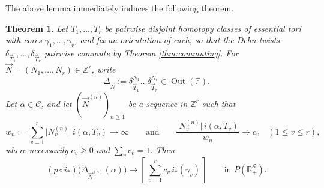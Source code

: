 \documentclass[12pt,a4paper]{amsart}
\numberwithin{equation}{section}
\DeclareMathOperator{\Out}{Out}
\newcommand{\FF}{\mathbb{F}}
\newcommand{\ZZ}{\mathbb{Z}}
\theoremstyle{plain}
\newtheorem{theorem}{Theorem}[section]
\theoremstyle{definition}
\theoremstyle{remark}
\begin{document}

The above lemma immediately induces the following theorem.

\begin{theorem} \label{thm:multi-converge}
    Let $T_1, \dots, T_r$ be pairwise disjoint homotopy classes of essential tori
    with cores $\gamma_1, \dots, \gamma_r$, and fix an orientation of each, so that
    the Dehn twists $\delta_{\vec T_1}, \dots, \delta_{\vec T_r}$ pairwise commute
    by Theorem \ref{thm:commuting}.
    For $\vec N = (N_1, \dots, N_r) \in \ZZ^r$, write
    \[
        \Delta_{\vec N} := \delta_{\vec T_1}^{N_1} \dots \delta_{\vec T_r}^{N_r} \in \Out(\FF).
    \]
    Let $\alpha \in \mathcal{C}$, and let $(\vec N^{(n)})_{n \ge 1}$ be a sequence in
    $\ZZ^r$ such that
    \[
        w_n := \sum_{v=1}^{r} \lvert N_v^{(n)} \rvert \, i(\alpha, T_v)
        \longrightarrow \infty
        \qquad\text{and}\qquad
        \frac{\lvert N_v^{(n)} \rvert \, i(\alpha, T_v)}{w_n} \longrightarrow c_v
        \quad (1 \le v \le r),
    \]
    where necessarily $c_v \ge 0$ and $\sum_v c_v = 1$.
    Then
    \[
        (p \circ i_*)\bigl(\Delta_{\vec N^{(n)}}(\alpha)\bigr)
        \longrightarrow
        \left[\, \sum_{v=1}^{r} c_v \, i_*(\gamma_v) \,\right]
        \qquad \text{in } P(\mathbb{R}_+^{\mathcal{S}}).
    \]
\end{theorem}
\end{document}
